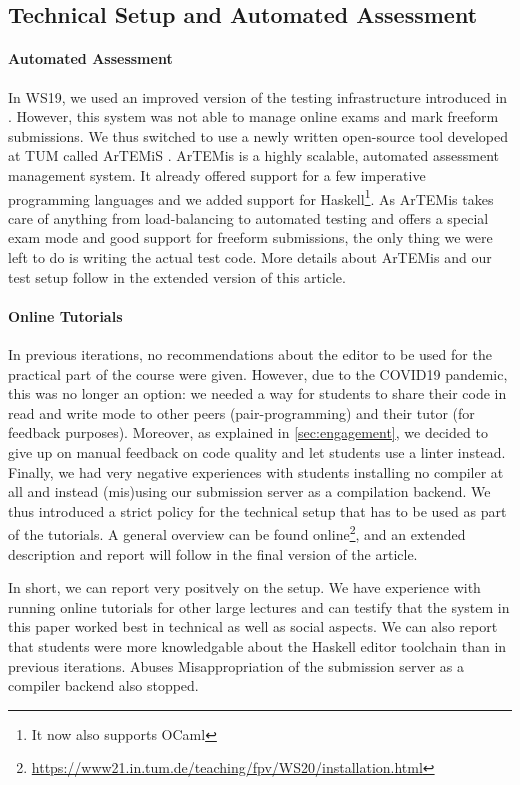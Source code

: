 \subsection{Technical Setup and Automated Assessment}\label{sec:tech_setup_test}

\paragraph{Automated Assessment}
In WS19, we used an improved version of
the testing infrastructure introduced in \citep{next_1100}.
However, this system was not able to manage online exams and mark freeform submissions.
We thus switched to use a newly written open-source
tool developed at TUM called ArTEMiS \citep{artemis}.
ArTEMis is a highly scalable, automated assessment management system.
It already offered support for a few imperative programming languages
and we added support for Haskell\footnote{It now also supports OCaml}.
As ArTEMis takes care of anything from load-balancing to
automated testing and
offers a special exam mode and good support for freeform submissions,
the only thing we were left to do is writing the actual test code.
More details about ArTEMis and our test setup follow
in the extended version of this article.

\paragraph{Online Tutorials}
In previous iterations,
no recommendations about the editor to be used for the practical part of the course
were given.
However, due to the COVID19 pandemic,
this was no longer an option:
we needed a way for students to share their code in read and write mode
to other peers (pair-programming) and their tutor (for feedback purposes).
Moreover, as explained in \cref{sec:engagement},
we decided to give up on manual feedback on code quality
and let students use a linter instead.
Finally, we had very negative experiences with students
installing no compiler at all
and instead (mis)using our submission server as a compilation backend.
We thus introduced a strict policy
for the technical setup that has to be used as part of
the tutorials.
A general overview can be found online\footnote{\url{https://www21.in.tum.de/teaching/fpv/WS20/installation.html}},
and an extended description and report will follow in the final version of the article.

In short, we can report very positvely on the setup.
We have experience with running online tutorials for other large lectures and can testify that
the system in this paper worked best in technical as well as social aspects.
We can also report that students were more knowledgable
about the Haskell editor toolchain than in previous iterations.
Abuses
Misappropriation of the submission server as a compiler backend also stopped.

